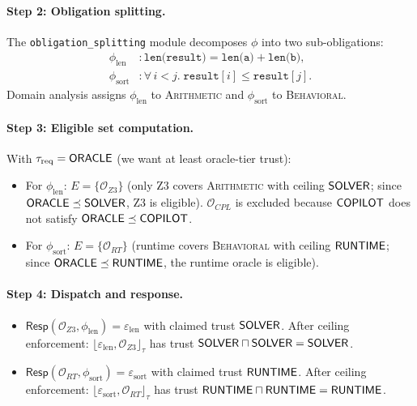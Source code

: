\documentclass[11pt]{article}
\newcommand{\Oracle}{\mathcal{O}}            %
\newcommand{\Orcl}[1]{\Oracle_{#1}}         %
\newcommand{\tmin}{\sqcap}                   %
\newcommand{\Ceil}[1]{\lfloor #1 \rfloor_{\tau}}   %
\newcommand{\Resp}{\mathsf{Resp}}           %
\begin{document}
\paragraph{Step 2: Obligation splitting.}
The \texttt{obligation\_splitting} module decomposes $\phi$ into two
sub-obligations:
\begin{align}
  \phi_{\mathrm{len}} &: \texttt{len(result)} = \texttt{len(a)} + \texttt{len(b)},
  \label{eq:phi-len}\\
  \phi_{\mathrm{sort}} &: \forall\, i < j.\;
  \texttt{result}[i] \leq \texttt{result}[j].
  \label{eq:phi-sort}
\end{align}
Domain analysis assigns $\phi_{\mathrm{len}}$ to \textsc{Arithmetic}
and $\phi_{\mathrm{sort}}$ to \textsc{Behavioral}.

\paragraph{Step 3: Eligible set computation.}
With $\tau_{\mathrm{req}} = \mathsf{ORACLE}$ (we want at least oracle-tier
trust):
\begin{itemize}[nosep]
  \item For $\phi_{\mathrm{len}}$: $E = \{\Orcl{Z3}\}$ (only Z3 covers
        \textsc{Arithmetic} with ceiling $\mathsf{SOLVER}$; since
        $\mathsf{ORACLE} \preceq \mathsf{SOLVER}$, Z3 is eligible).
        $\Orcl{CPL}$ is excluded because $\mathsf{COPILOT}$ does not satisfy
        $\mathsf{ORACLE} \preceq \mathsf{COPILOT}$.
  \item For $\phi_{\mathrm{sort}}$: $E = \{\Orcl{RT}\}$ (runtime covers
        \textsc{Behavioral} with ceiling $\mathsf{RUNTIME}$; since
        $\mathsf{ORACLE} \preceq \mathsf{RUNTIME}$, the runtime oracle is eligible).
\end{itemize}

\paragraph{Step 4: Dispatch and response.}
\begin{itemize}[nosep]
  \item $\Resp(\Orcl{Z3}, \phi_{\mathrm{len}}) =
        \varepsilon_{\mathrm{len}}$
        with claimed trust $\mathsf{SOLVER}$.  After ceiling enforcement:
        $\Ceil{\varepsilon_{\mathrm{len}}, \Orcl{Z3}}$ has trust
        $\Tsolver \tmin \Tsolver = \Tsolver$.
  \item $\Resp(\Orcl{RT}, \phi_{\mathrm{sort}}) =
        \varepsilon_{\mathrm{sort}}$
        with claimed trust $\mathsf{RUNTIME}$.  After ceiling enforcement:
        $\Ceil{\varepsilon_{\mathrm{sort}}, \Orcl{RT}}$ has trust
        $\Truntime \tmin \Truntime = \Truntime$.
\end{itemize}
\end{document}
